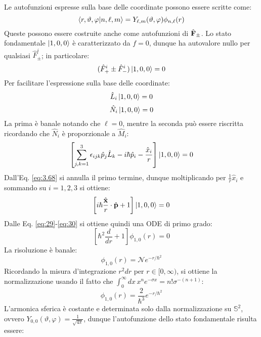 Le autofunzioni espresse sulla base delle coordinate possono essere scritte come:
\begin{equation}
	\braket{r,\vartheta,\varphi | n,\ell,m} = Y_{\ell,m}(\vartheta,\varphi) \phi_{n,\ell}(r)
	\label{eq:3.66}
\end{equation}
Queste possono essere costruite anche come autofunzioni di $ \hat{\mathbf{F}}_{\pm} $. Lo stato fondamentale $ \ket{1,0,0} $ è caratterizzato da $ f = 0 $, dunque ha autovalore nullo per qualsiasi $ \hat{F}_{\pm}^i $; in particolare:
\begin{equation}
	(\hat{F}_+^i \pm \hat{F}_-^i) \ket{1,0,0} = 0
	\label{eq:3.67}
\end{equation}
Per facilitare l'espressione sulla base delle coordinate:
\begin{equation}
	\hat{L}_i \ket{1,0,0} = 0
	\label{eq:3.68}
\end{equation}
\begin{equation}
	\hat{N}_i \ket{1,0,0} = 0
	\label{eq:3.69}
\end{equation}
La prima è banale notando che $ \ell = 0 $, mentre la seconda può essere riscritta ricordando che $ \hat{N}_i $ è proporzionale a $ \hat{M}_i $:
\begin{equation*}
	\left[ \sum_{j,k = 1}^{3} \epsilon_{ijk} \hat{p}_j \hat{L}_k - i\hbar \hat{p}_i - \frac{\hat{x}_i}{r} \right] \ket{1,0,0} = 0
\end{equation*}
Dall'Eq. \ref{eq:3.68} si annulla il primo termine, dunque moltiplicando per $ \frac{1}{r} \hat{x}_i $ e sommando su $ i = 1,2,3 $ si ottiene:
\begin{equation*}
	\left[ i\hbar \frac{\hat{\mathbf{x}}}{r} \cdot \hat{\mathbf{p}} + 1 \right] \ket{1,0,0} = 0
\end{equation*}
Dalle Eq. \ref{eq:29}-\ref{eq:30} si ottiene quindi una ODE di primo grado:
\begin{equation*}
	\left[ \hbar^2 \frac{d}{dr} + 1 \right] \phi_{1,0}(r) = 0
\end{equation*}
La risoluzione è banale:
\begin{equation*}
	\phi_{1,0}(r) = \mathcal{N} e^{- r / \hbar^2}
\end{equation*}
Ricordando la misura d'integrazione $ r^2 dr $ per $ r \in [0,\infty) $, si ottiene la normalizzazione usando il fatto che $ \int_0^{\infty} dx\, x^n e^{-\sigma x} = n! \sigma^{-(n + 1)} $:
\begin{equation*}
	\phi_{1,0}(r) = \frac{2}{\hbar^3} e^{- r / \hbar^2}
\end{equation*}
L'armonica sferica è costante e determinata solo dalla normalizzazione su $ \mathbb{S}^2 $, ovvero $ Y_{0,0}(\vartheta,\varphi) = \frac{1}{\sqrt{4\pi}} $, dunque l'autofunzione dello stato fondamentale risulta essere:
